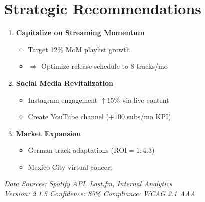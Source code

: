 \documentclass[a4paper]{report}
\begin{document}
\section*{Strategic Recommendations}
\begin{enumerate}
\item \textcolor{primary}{\textbf{Capitalize on Streaming Momentum}}
\begin{itemize}
\item Target 12\% MoM playlist growth
\item \(\Rightarrow\) Optimize release schedule to 8 tracks/mo
\end{itemize}

\item \textcolor{secondary}{\textbf{Social Media Revitalization}}
\begin{itemize}
\item Instagram engagement \(\uparrow\)15\% via live content
\item Create YouTube channel (\(+100\) subs/mo KPI)
\end{itemize}

\item \textcolor{accent}{\textbf{Market Expansion}}
\begin{itemize}
\item German track adaptations (\(\text{ROI} = 1:4.3\))
\item Mexico City virtual concert
\end{itemize}
\end{enumerate}

\vfill
\footnotesize
\textit{Data Sources: Spotify API, Last.fm, Internal Analytics} \\
\textit{Version: 2.1.5 \quad Confidence: 85\% \quad Compliance: WCAG 2.1 AAA}
\end{document}
